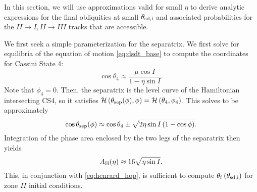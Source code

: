 \documentclass[
        fleqn,
        usenatbib,
        referee,
    ]{mnras}
\newcommand*{\p}[1]{\left(#1\right)}
\begin{document}
In this section, we will use approximations valid for small $\eta$ to derive
analytic expressions for the final obliquities at small $\theta_{\rm sd, i}$ and
associated probabilities for the $II \to I, II \to III$ tracks that are
accessible.

We first seek a simple parameterization for the separatrix. We first solve for
equilibria of the equation of motion \autoref{eq:dsdt_base} to compute the
coordinates for Cassini State 4:
\begin{equation}
    \cos \theta_4 \approx \frac{\mu \cos I}{1 - \eta \sin I}.
\end{equation}
Note that $\phi_4 = 0$. Then, the separatrix is the level curve of the
Hamiltonian intersecting CS4, so it satisfies $\mathcal{H}\p{\theta_{\rm
sep}(\phi), \phi} = \mathcal{H}\p{\theta_4, \phi_4}$. This solves to be
approximately
\begin{equation}
    \cos \theta_{\rm sep}(\phi) \approx \cos \theta_4 \pm
        \sqrt{2\eta \sin I\p{1 - \cos \phi}}.
\end{equation}
Integration of the phase area enclosed by the two legs of the separatrix then
yields
\begin{equation}
    A_{\rm II}(\eta) \approx 16\sqrt{\eta \sin I}.\label{eq:a_approx}
\end{equation}
This, in conjunction with \autoref{eq:henrard_hop}, is sufficient to compute
$\theta_{\rm f}\p{\theta_{\rm sd, i}}$ for zone $II$ initial conditions.
\end{document}
